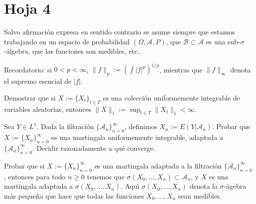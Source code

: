 


\newpage
\section{Hoja 4}

Salvo afirmaci\'on expresa en sentido
contrario se asume siempre que estamos trabajando en un espacio de probabilidad $(\Omega, \mathcal{A}, P)$,
que  $\mathcal{B}\subset \mathcal{A}$ es una sub-$\sigma$-\'algebra, que las funciones son medibles, etc..

Recordatorio: si $0 < p < \infty$, $\|f\|_p := \left(\int|f|^p\right)^{1/p}$, mientras que
$\|f\|_\infty$ denota el supremo esencial de $|f|$. 

\begin{problem}[1] Demostrar que si $X := \{X_t\}_{t\in T}$  es una colecci\'on uniformemente integrable
de variables aleatorias, entonces
$\|X\|_1 := \sup_{t\in T} \|X_t\|_{1} < \infty$.
\solution

\begin{expla}

\end{expla}

\end{problem}


\begin{problem}[2] Sea $Y\in L^1$. Dada la filtraci\'on
$\{\mathcal{A}_n\}_{n=0}^{\infty}$, definimos
$X_n := E(Y|\mathcal{A}_n)$. 
Probar que $X := \{X_n\}_{n=0}^{\infty}$  es una martingala uniformemente integrable, 
adaptada a 
$\{\mathcal{A}_n\}_{n=0}^{\infty}$.  Decidir razonadamente a qu\'e converge.
\solution

\begin{expla}

\end{expla}

\end{problem}


\begin{problem}[3] Probar que si $X := \{X_n\}_{n=0}^{\infty}$  es una martingala adaptada a la filtraci\'on
$\{\mathcal{A}_n\}_{n=0}^{\infty}$, entonces para todo $n\ge 0$ tenemos 
que $\sigma (X_0, \dots ,X_n) \subset \mathcal{A}_n$, y $X$  es una martingala adaptada a  
$\sigma (X_0, \dots ,X_n)$. Aqu\'{\i} $\sigma (X_0, \dots ,X_n)$ denota la $\sigma$-\'agebra m\'as
peque\~{n}a que hace que todas las funciones $ X_0, \dots ,X_n $ sean medibles.
\solution

\begin{expla}

\end{expla}

\end{problem}

